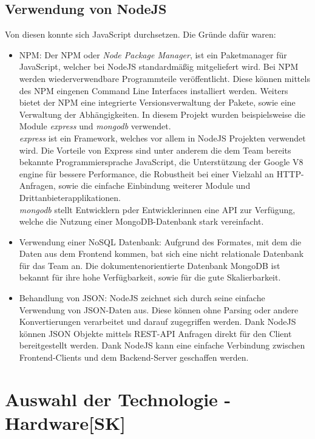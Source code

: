   \subsection{Verwendung von NodeJS}
  Von diesen konnte sich JavaScript durchsetzen. Die Gründe dafür waren:\cite{WhyNodeJs}
  \begin{itemize}
    \item NPM:
    Der NPM oder \textit{Node Package Manager}, ist ein Paketmanager für JavaScript, welcher bei NodeJS standardmäßig mitgeliefert wird. Bei NPM werden wiederverwendbare Programmteile veröffentlicht. Diese können mittels des NPM eingenen Command Line Interfaces installiert werden. Weiters bietet der NPM eine integrierte Versionsverwaltung der Pakete, sowie eine Verwaltung der Abhängigkeiten.
    In diesem Projekt wurden beispielsweise die Module \textit{express} und \textit{mongodb} verwendet. \\
    \textit{express} ist ein Framework, welches vor allem in NodeJS Projekten verwendet wird. Die Vorteile von Express sind unter anderem die dem Team bereits bekannte Programmiersprache JavaScript, die Unterstützung der Google V8 engine für bessere Performance, die Robustheit bei einer Vielzahl an HTTP-Anfragen, sowie die einfache Einbindung weiterer Module und Drittanbieterapplikationen. \cite{WhyExpress}\\
    \textit{mongodb} stellt Entwicklern pder Entwicklerinnen eine API zur Verfügung, welche die Nutzung einer MongoDB-Datenbank stark vereinfacht.
    \item Verwendung einer NoSQL Datenbank:
    Aufgrund des Formates, mit dem die Daten aus dem Frontend kommen, bat sich eine nicht relationale Datenbank für das Team an. Die dokumentenorientierte Datenbank MongoDB ist bekannt für ihre hohe Verfügbarkeit, sowie für die gute Skalierbarkeit.
    \cite{WhyMongoDB}
    \item Behandlung von JSON:
    NodeJS zeichnet sich durch seine einfache Verwendung von JSON-Daten aus. Diese können ohne Parsing oder andere Konvertierungen verarbeitet und darauf zugegriffen werden. Dank NodeJS können JSON Objekte mittels REST-API Anfragen direkt für den Client bereitgestellt werden.
    Dank NodeJS kann eine einfache Verbindung zwischen Frontend-Clients und dem Backend-Server geschaffen werden.
  \end{itemize}

\section{Auswahl der Technologie - Hardware[SK]}
